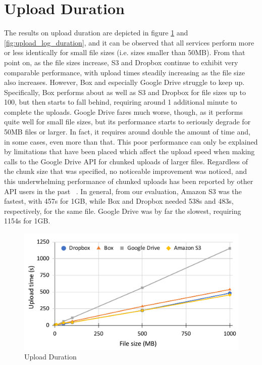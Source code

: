 \section{Upload Duration}
The results on upload duration are depicted in figure \ref{fig:upload_duration} and \ref{fig:upload_log_duration}, and it can be observed that all services perform more or less identically for small file sizes (i.e. sizes smaller than 50MB). From that point on,  as the file sizes increase, S3 and Dropbox continue to exhibit very comparable performance, with upload times steadily increasing as the file size also increases.  However, Box and especially Google Drive struggle to keep up. Specifically, Box performs about as well as S3 and Dropbox for file sizes up to 100, but then starts to fall behind, requiring around 1 additional minute to complete the uploads. Google Drive fares much worse, though, as it performs quite well for small file sizes, but its performance starts to seriously degrade for 50MB files or larger. In fact, it requires around double the amount of time and, in some cases, even more than that. This poor performance can only be explained by limitations that have been placed which affect the  upload speed when making calls to the Google Drive API for chunked uploads of larger files. Regardless of the chunk size that was specified, no noticeable improvement was noticed, and this underwhelming performance of chunked uploads has been reported by other API users in the past ~\cite{drive_chunked_performance}. In general, from our evaluation, Amazon S3 was the fastest, with 457s for 1GB, while Box and Dropbox needed 538s and 483s, respectively, for the same file. Google Drive was by far the slowest, requiring 1154s for 1GB.

\begin{figure} []
	\centering
	\includegraphics[scale=0.6]{images/upload_chart}
	\caption{\label{fig:upload_duration}Upload Duration}
\end{figure}

